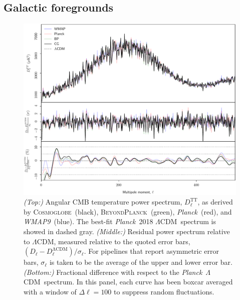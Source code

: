 \documentclass[twocolumn]{../../common/aa}
\def\WMAPnine{\emph{WMAP9}}
\def\planck{\emph{Planck}}
\def\LCDM{$\Lambda$CDM}
\newcommand{\bp}{\textsc{BeyondPlanck}}
\newcommand{\cosmoglobe}{\textsc{Cosmoglobe}}
\newcommand{\K}[0]{\textit K}
\newcommand{\W}[0]{\textit W}
\begin{document}

\subsection{Galactic foregrounds}\label{subsec:foregrounds}

\begin{figure}
	\includegraphics[width=\textwidth]{figures/cl_TT_CG_v1.pdf}
	\caption{\textit{(Top:)} Angular CMB temperature power spectrum, $D_\ell^\mathrm{TT}$, as derived by \cosmoglobe\ (black), \bp\ (green), \planck\ (red), and \WMAPnine\ (blue). The best-fit \planck\ 2018 \LCDM\ spectrum is showed in dashed gray. \textit{(Middle:)} Residual power spectrum relative to \LCDM, measured relative to the quoted error bars, $(D_\ell-D_\ell^\mathrm{\Lambda CDM})/\sigma_\ell$. For pipelines that report asymmetric error bars, $\sigma_\ell$ is taken to be the average of the upper and lower error bar. \textit{(Bottom:)} Fractional difference with respect to the \planck\ \LCDM\ spectrum. In this panel, each curve has been boxcar averaged with a window of $\Delta\ell=100$ to suppress random fluctuations.}
	\label{fig:cl_tt}
\end{figure}
\end{document}
